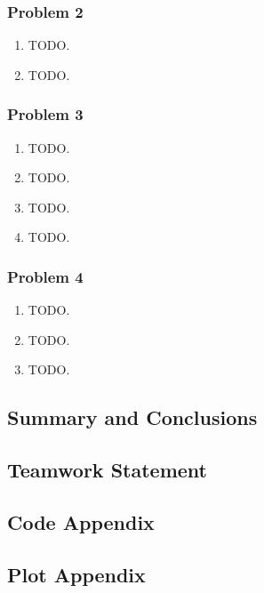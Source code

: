 \documentclass[letter,11pt]{article}
\begin{document}
\subsubsection*{Problem 2}
\begin{enumerate}[label=\alph*.]
  \item TODO.
  \item TODO.
\end{enumerate}

\subsubsection*{Problem 3}
\begin{enumerate}[label=\alph*.]
  \item TODO.
  \item TODO.
  \item TODO.
  \item TODO.
\end{enumerate}

\subsubsection*{Problem 4}
\begin{enumerate}[label=\alph*.]
  \item TODO.
  \item TODO.
  \item TODO.
\end{enumerate}

\subsection*{Summary and Conclusions}

\begin{thebibliography}{99}
\end{thebibliography}

\subsection*{Teamwork Statement}

\subsection*{Code Appendix}

\subsection*{Plot Appendix}
\end{document}
